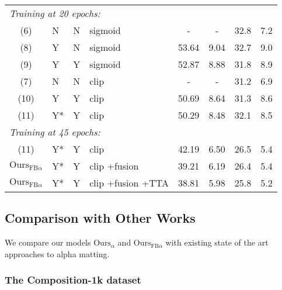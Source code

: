 \documentclass[runningheads]{llncs}
\begin{document}
\begin{table}[t]
\begin{tabular}{clclcccc}
   \midrule
     \multicolumn{6}{l}{\textit{Training at 20 epochs:} \vspace{.3em}} &  &\\ 
  (6) &     N & N                                                   & sigmoid           & -  &- & 32.8& 7.2\\
  (8) &      Y&N                               & sigmoid           & 53.64        &  9.04    &  32.7& 9.0\\
  (9) &        Y&Y                    & sigmoid           &            52.87                   & 8.88  & 31.8 &  8.9 \\
  (7) &      N&N                                                    & clip              & -                                    & - & 31.2& 6.9\\
  (10) &         Y&Y                       & clip              &        50.69                  & 8.64   &    31.3  & 8.6 \\
  (11)  &         Y* &Y & clip              &                50.29                          &  8.48  & 32.1 &  8.5 \\ \midrule
   \multicolumn{6}{l}{\textit{Training at 45 epochs:} \vspace{.3em}} &  \\ 
  (11)&  Y*&Y  & clip      &  42.19      &     6.50  & 26.5 &  5.4 \\
   \textbf{$\text{Ours}_{\mathrm{FB}\alpha}$}& Y*&Y   & clip +fusion     & 39.21       &    6.19  & 26.4 & 5.4   \\
   \textbf{$\text{Ours}_{\mathrm{FB}\alpha}$} &Y* &Y   & clip +fusion +TTA  & 38.81        &   5.98  & 25.8 & 5.2\\
\bottomrule
\end{tabular}
\end{table}

\subsection{Comparison with Other Works}

We compare our models \textbf{$\text{Ours}_\alpha$} and $\text{Ours}_{\mathrm{FB}\alpha}$ with existing state of the art approaches to alpha matting. 


\subsubsection{The Composition-1k dataset}
\end{document}
